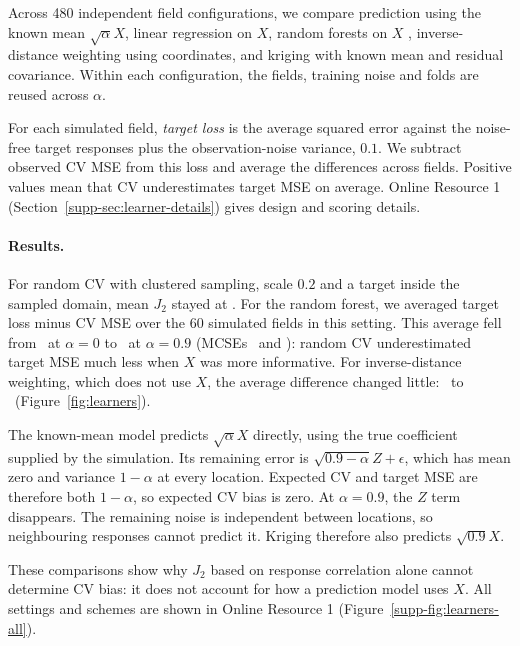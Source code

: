 Across 480 independent field configurations, we compare prediction using the known mean $\sqrt{\alpha}X$, linear regression on $X$, random forests on $X$ \citep{wright2017ranger}, inverse-distance weighting using coordinates, and kriging with known mean and residual covariance. Within each configuration, the fields, training noise and folds are reused across $\alpha$.

For each simulated field, \emph{target loss} is the average squared error against the noise-free target responses plus the observation-noise variance, $0.1$. We subtract observed CV MSE from this loss and average the differences across fields. Positive values mean that CV underestimates target MSE on average. Online Resource 1 (Section~\ref*{supp-sec:learner-details}) gives design and scoring details.

\begin{samepage}
\paragraph{Results.}
For random CV with clustered sampling, scale $0.2$ and a target inside the sampled domain, mean $J_2$ stayed at \ConstantMarginal. For the random forest, we averaged target loss minus CV MSE over the 60 simulated fields in this setting. This average fell from \ForestZero\ at $\alpha=0$ to \ForestNine\ at $\alpha=0.9$ (MCSEs \ForestZeroSE\ and \ForestNineSE): random CV underestimated target MSE much less when $X$ was more informative. For inverse-distance weighting, which does not use $X$, the average difference changed little: \IDWZero\ to \IDWNine\ (Figure~\ref{fig:learners}).

\end{samepage}

The known-mean model predicts $\sqrt{\alpha}X$ directly, using the true coefficient supplied by the simulation. Its remaining error is $\sqrt{0.9-\alpha}Z+\epsilon$, which has mean zero and variance $1-\alpha$ at every location. Expected CV and target MSE are therefore both $1-\alpha$, so expected CV bias is zero. At $\alpha=0.9$, the $Z$ term disappears. The remaining noise is independent between locations, so neighbouring responses cannot predict it. Kriging therefore also predicts $\sqrt{0.9}X$.

These comparisons show why $J_2$ based on response correlation alone cannot determine CV bias: it does not account for how a prediction model uses $X$. All settings and schemes are shown in Online Resource 1 (Figure~\ref*{supp-fig:learners-all}).

